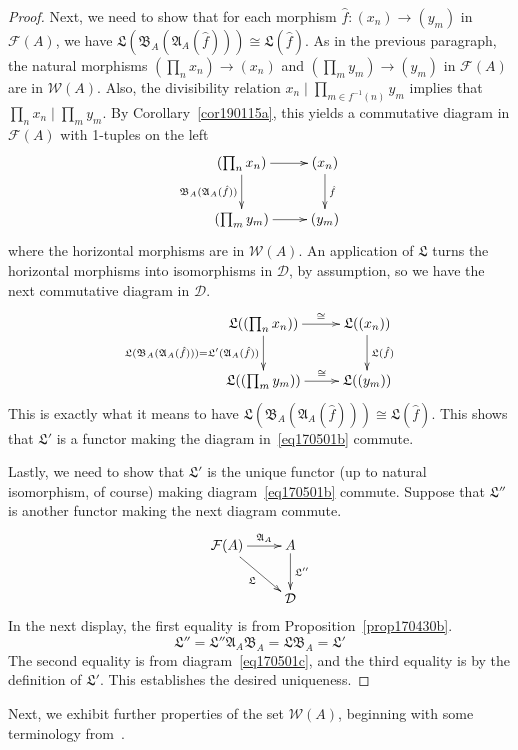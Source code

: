\documentclass[reqno]{amsart}
\theoremstyle{plain}
\theoremstyle{definition}
\newcommand{\cat}[1]{\mathcal{#1}}
\newcommand{\catw}{\cat{W}}
\newcommand{\catf}{\cat{F}}
\newcommand{\catd}{\cat{D}}
\numberwithin{equation}{lem}
\begin{document}
\begin{proof}
Next, we need to show that for each 
morphism $\hat f\colon(x_n)\to(y_m)$ in $\catf(A)$, we have $\mathfrak L(\mathfrak B_A(\mathfrak A_A(\hat f)))\cong\mathfrak L(\hat f)$.
As in the previous paragraph, the natural morphisms $(\prod_nx_n)\to(x_n)$ and $(\prod_my_m)\to(y_m)$ in $\catf(A)$ are in $\catw(A)$.
Also, the divisibility 
relation $x_n\mid\prod_{m\in f^{-1}(n)}y_m$ implies
that $\prod_nx_n\mid \prod_my_m$.
By Corollary~\ref{cor190115a}, 
this yields a commutative diagram in $\catf(A)$ with 1-tuples on the left
$$\xymatrix{
(\prod_nx_n)\ar[r]\ar[d]_{\mathfrak B_A(\mathfrak A_A(\hat f))}
&(x_n)\ar[d]^{\hat f}\\
(\prod_my_m)\ar[r]
&(y_m)
}$$
where the horizontal morphisms are in $\catw(A)$.
An application of $\mathfrak L$ turns the horizontal morphisms into isomorphisms in $\catd$, by assumption, so we have the next commutative diagram in $\catd$.
$$\xymatrix{
\mathfrak L((\prod_nx_n))\ar[r]^-\cong\ar[d]_{\mathfrak L(\mathfrak B_A(\mathfrak A_A(\hat f)))=\mathfrak L'(\mathfrak A_A(\hat f))}
&\mathfrak L((x_n))\ar[d]^{\mathfrak L(\hat f)}\\
\mathfrak L((\prod_my_m))\ar[r]^-\cong
&\mathfrak L((y_m))
}$$
This is exactly what it means to have $\mathfrak L(\mathfrak B_A(\mathfrak A_A(\hat f)))\cong\mathfrak L(\hat f)$. 
This shows that $\mathfrak L'$ is a functor making the diagram in~\eqref{eq170501b} commute.

Lastly, we need to show that $\mathfrak L'$ is the unique functor (up to natural 
isomorphism, of course) making diagram~\eqref{eq170501b} commute.
Suppose that $\mathfrak L''$ is another functor making the next diagram commute.
\begin{equation}\label{eq170501c}
\begin{split}
\xymatrix{
\catf(A)\ar[r]^-{\mathfrak A_A}\ar[rd]_{\mathfrak L}
&A\ar[d]^-{\mathfrak L''}
\\
&\catd}
\end{split}
\end{equation}
In the next display, the first equality is from Proposition~\ref{prop170430b}.
$$\mathfrak L''=\mathfrak L''\mathfrak{A}_A\mathfrak{B}_A=\mathfrak L\mathfrak{B}_A=\mathfrak L'
$$
The second equality is from diagram~\eqref{eq170501c}, and the third equality is by the definition of $\mathfrak L'$.
This establishes the desired uniqueness.
\end{proof}

Next, we exhibit further properties of the set $\catw(A)$,
beginning with some terminology from~\cite[Chap.~2]{MR2102294}.
\end{document}
